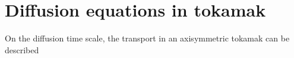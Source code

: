 \section{Diffusion equations in tokamak}

On the diffusion time scale, the transport in an axisymmetric tokamak can be described